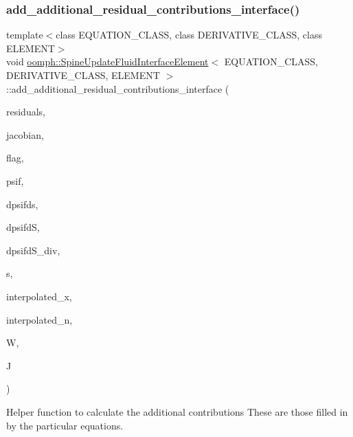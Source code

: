 \subsubsection{\texorpdfstring{add\+\_\+additional\+\_\+residual\+\_\+contributions\+\_\+interface()}{add\_additional\_residual\_contributions\_interface()}}
{\footnotesize\ttfamily template$<$class E\+Q\+U\+A\+T\+I\+O\+N\+\_\+\+C\+L\+A\+SS, class D\+E\+R\+I\+V\+A\+T\+I\+V\+E\+\_\+\+C\+L\+A\+SS, class E\+L\+E\+M\+E\+NT$>$ \\
void \hyperlink{classoomph_1_1SpineUpdateFluidInterfaceElement}{oomph\+::\+Spine\+Update\+Fluid\+Interface\+Element}$<$ E\+Q\+U\+A\+T\+I\+O\+N\+\_\+\+C\+L\+A\+SS, D\+E\+R\+I\+V\+A\+T\+I\+V\+E\+\_\+\+C\+L\+A\+SS, E\+L\+E\+M\+E\+NT $>$\+::add\+\_\+additional\+\_\+residual\+\_\+contributions\+\_\+interface (\begin{DoxyParamCaption}\item[{\hyperlink{classoomph_1_1Vector}{Vector}$<$ double $>$ \&}]{residuals,  }\item[{\hyperlink{classoomph_1_1DenseMatrix}{Dense\+Matrix}$<$ double $>$ \&}]{jacobian,  }\item[{const unsigned \&}]{flag,  }\item[{const \hyperlink{classoomph_1_1Shape}{Shape} \&}]{psif,  }\item[{const \hyperlink{classoomph_1_1DShape}{D\+Shape} \&}]{dpsifds,  }\item[{const \hyperlink{classoomph_1_1DShape}{D\+Shape} \&}]{dpsifdS,  }\item[{const \hyperlink{classoomph_1_1DShape}{D\+Shape} \&}]{dpsifd\+S\+\_\+div,  }\item[{const \hyperlink{classoomph_1_1Vector}{Vector}$<$ double $>$ \&}]{s,  }\item[{const \hyperlink{classoomph_1_1Vector}{Vector}$<$ double $>$ \&}]{interpolated\+\_\+x,  }\item[{const \hyperlink{classoomph_1_1Vector}{Vector}$<$ double $>$ \&}]{interpolated\+\_\+n,  }\item[{const double \&}]{W,  }\item[{const double \&}]{J }\end{DoxyParamCaption})\hspace{0.3cm}{\ttfamily [inline]}}



Helper function to calculate the additional contributions These are those filled in by the particular equations. 



